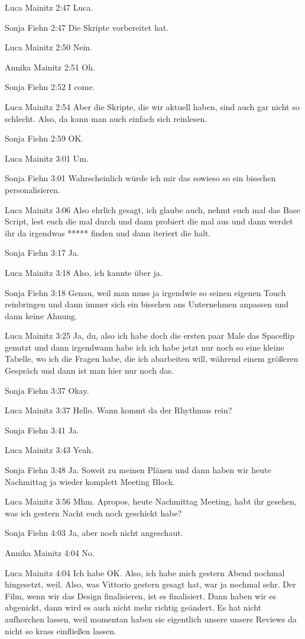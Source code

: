 Luca Mainitz   2:47
Luca.

Sonja Fiehn   2:47
Die Skripte vorbereitet hat.

Luca Mainitz   2:50
Nein.

Annika Mainitz   2:51
Oh.

Sonja Fiehn   2:52
I come.

Luca Mainitz   2:54
Aber die Skripte, die wir aktuell haben, sind auch gar nicht so schlecht. Also, da kann man auch einfach sich reinlesen.

Sonja Fiehn   2:59
OK.

Luca Mainitz   3:01
Um.

Sonja Fiehn   3:01
Wahrscheinlich würde ich mir das sowieso so ein bisschen personalisieren.

Luca Mainitz   3:06
Also ehrlich gesagt, ich glaube auch, nehmt euch mal das Base Script, lest euch die mal durch und dann probiert die mal aus und dann werdet ihr da irgendwas ***** finden und dann iteriert die halt.

Sonja Fiehn   3:17
Ja.

Luca Mainitz   3:18
Also, ich kannte über ja.

Sonja Fiehn   3:18
Genau, weil man muss ja irgendwie so seinen eigenen Touch reinbringen und dann immer sich ein bisschen ans Unternehmen anpassen und dann keine Ahnung.

Luca Mainitz   3:25
Ja, du, also ich habe doch die ersten paar Male das Spaceflip genutzt und dann irgendwann habe ich ich habe jetzt nur noch so eine kleine Tabelle, wo ich die Fragen habe, die ich abarbeiten will, während einem größeren Gespräch und dann ist man hier nur noch das.

Sonja Fiehn   3:37
Okay.

Luca Mainitz   3:37
Hello.
Wann kommt da der Rhythmus rein?

Sonja Fiehn   3:41
Ja.

Luca Mainitz   3:43
Yeah.

Sonja Fiehn   3:48
Ja.
Soweit zu meinen Plänen und dann haben wir heute Nachmittag ja wieder komplett Meeting Block.

Luca Mainitz   3:56
Mhm.
Apropos, heute Nachmittag Meeting, habt ihr gesehen, was ich gestern Nacht euch noch geschickt habe?

Sonja Fiehn   4:03
Ja, aber noch nicht angeschaut.

Annika Mainitz   4:04
No.

Luca Mainitz   4:04
Ich habe OK. Also, ich habe mich gestern Abend nochmal hingesetzt, weil.
Also, was Vittorio gestern gesagt hat, war ja nochmal sehr.
Der Film, wenn wir das Design finalisieren, ist es finalisiert. Dann haben wir es abgenickt, dann wird es auch nicht mehr richtig geändert. Es hat nicht aufhorchen lassen, weil momentan haben sie eigentlich unsere unsere Reviews da nicht so krass einfließen lassen.

